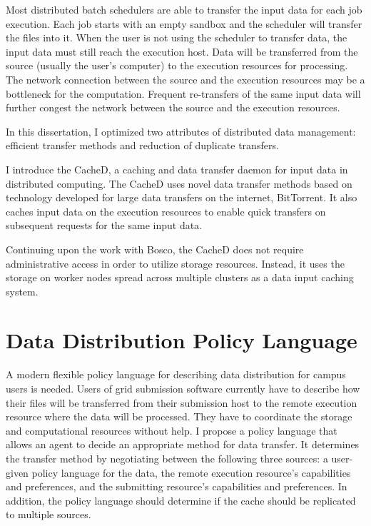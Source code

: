 Most distributed batch schedulers are able to transfer the input data for each job execution.  Each job starts with an empty sandbox and the scheduler will transfer the files into it.  When the user is not using the scheduler to transfer data, the input data must still reach the execution host.  Data will be transferred from the source (usually the user's computer) to the execution resources for processing.  The network connection between the source and the execution resources may be a bottleneck for the computation.  Frequent re-transfers of the same input data will further congest the network between the source and the execution resources.

In this dissertation, I optimized two attributes of distributed data management: efficient transfer methods and reduction of duplicate transfers.

I introduce the CacheD, a caching and data transfer daemon for input data in distributed computing.  The CacheD uses novel data transfer methods based on technology developed for large data transfers on the internet, BitTorrent.  It also caches input data on the execution resources to enable quick transfers on subsequent requests for the same input data.

Continuing upon the work with Bosco, the CacheD does not require administrative access in order to utilize storage resources.  Instead, it uses the storage on worker nodes spread across multiple clusters as a data input caching system.

\section{Data Distribution Policy Language}

A modern flexible policy language for describing data distribution for campus users is needed.  Users of grid submission software currently have to describe how their files will be transferred from their submission host to the remote execution resource where the data will be processed.  They have to coordinate the storage and computational resources without help.  I propose a policy language that allows an agent to decide an appropriate method for data transfer.  It determines the transfer method by negotiating between the following three sources: a user-given policy language for the data, the remote execution resource's capabilities and preferences, and the submitting resource's capabilities and preferences.  In addition, the policy language should determine if the cache should be replicated to multiple sources.

